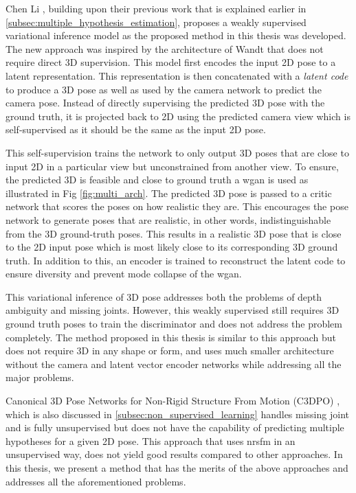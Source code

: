 Chen Li \etal \cite{weaklymultiple}, building upon their previous work \cite{multiplehypo} that is explained earlier in \ref{subsec:multiple_hypothesis_estimation}, proposes a weakly supervised variational inference model as the proposed method in this thesis was developed. The new approach \cite{weaklymultiple} was inspired by the architecture of Wandt \etal \cite{repnet} that does not require direct 3D supervision. This model first encodes the input 2D pose to a latent representation. This representation is then concatenated with a \textit{latent code} to produce a 3D pose as well as used by the camera network to predict the camera pose. Instead of directly supervising the predicted 3D pose with the ground truth, it is projected back to 2D using the predicted camera view which is self-supervised as it should be the same as the input 2D pose. 

This self-supervision trains the network to only output 3D poses that are close to input 2D in a particular view but unconstrained from another view. To ensure, the predicted 3D is feasible and close to ground truth a \ac{wgan} is used as illustrated in Fig \ref{fig:multi_arch}. The predicted 3D pose is passed to a critic network that scores the poses on how realistic they are. This encourages the pose network to generate poses that are realistic, in other words, indistinguishable from the 3D ground-truth poses. This results in a realistic 3D pose that is close to the 2D input pose which is most likely close to its corresponding 3D ground truth. In addition to this, an encoder is trained to reconstruct the latent code to ensure diversity and prevent mode collapse of the \ac{wgan}. 

This variational inference of 3D pose addresses both the problems of depth ambiguity and missing joints. However, this weakly supervised still requires 3D ground truth poses to train the discriminator and does not address the problem completely. The method proposed in this thesis is similar to this approach but does not require 3D in any shape or form, and uses much smaller architecture without the camera and latent vector encoder networks while addressing all the major problems. 

Canonical 3D Pose Networks for Non-Rigid Structure From Motion (C3DPO) \cite{c3dpo}, which is also discussed in \ref{subsec:non_supervised_learning} handles missing joint and is fully unsupervised but does not have the capability of predicting multiple hypotheses for a given 2D pose. This approach that uses \ac{nrsfm} in an unsupervised way, does not yield good results compared to other approaches. In this thesis, we present a method that has the merits of the above approaches and addresses all the aforementioned problems.